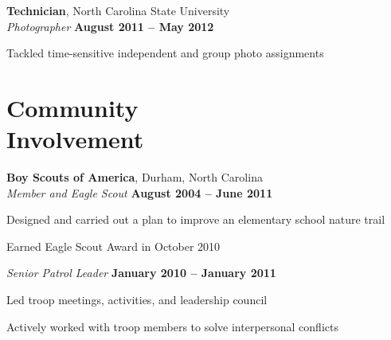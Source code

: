 \documentclass[margin,line,letterpaper]{resume}
\begin{document}
\begin{resume}
    \textbf{Technician}, North Carolina State University \vspace{2mm}\\\vspace{1mm}%
    \textsl{Photographer} \hfill \textbf{August 2011 -- May 2012}\vspace{-3mm}\\\vspace{-1mm}%
    \begin{list2}
    \item Tackled time-sensitive independent and group photo assignments
    \end{list2}\vspace{-1.5mm}

    \section{\mysidestyle Community\\Involvement}


    \textbf{Boy Scouts of America}, Durham, North Carolina \vspace{2mm}\\\vspace{1mm}%
    \textsl{Member and Eagle Scout} \hfill \textbf{August 2004 -- June 2011}\vspace{-3mm}\\\vspace{-1mm}%
    \begin{list2}
    \item Designed and carried out a plan to improve an elementary school nature trail
    \item Earned Eagle Scout Award in October 2010
    \end{list2}\vspace{-1.5mm}

    \textsl{Senior Patrol Leader} \hfill \textbf{January 2010 -- January 2011}\vspace{-3mm}\\\vspace{-1mm}%
    \begin{list2}
    \item Led troop meetings, activities, and leadership council
    \item Actively worked with troop members to solve interpersonal conflicts
    \end{list2}\vspace{-1.5mm}



\end{resume}
\end{document}
